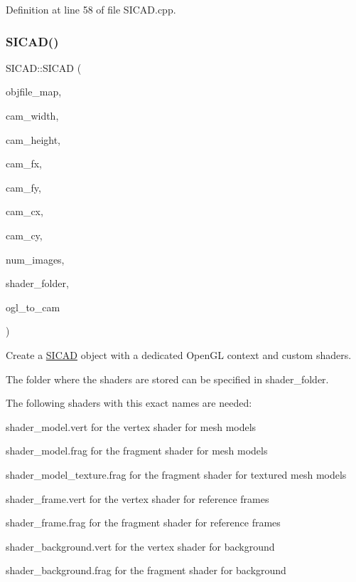 Definition at line 58 of file S\+I\+C\+A\+D.\+cpp.

\mbox{\label{classSICAD_a2d0feeca1d62a456f861046e377cd303}} 
\subsubsection{\texorpdfstring{S\+I\+C\+A\+D()}{SICAD()}\hspace{0.1cm}{\footnotesize\ttfamily [4/4]}}
{\footnotesize\ttfamily S\+I\+C\+A\+D\+::\+S\+I\+C\+AD (\begin{DoxyParamCaption}\item[{const \mbox{\hyperlink{classSICAD_a9e1e1460d4c0f331b4fd015aae4dd721}{Model\+Path\+Container}} \&}]{objfile\+\_\+map,  }\item[{const G\+Lsizei}]{cam\+\_\+width,  }\item[{const G\+Lsizei}]{cam\+\_\+height,  }\item[{const G\+Lfloat}]{cam\+\_\+fx,  }\item[{const G\+Lfloat}]{cam\+\_\+fy,  }\item[{const G\+Lfloat}]{cam\+\_\+cx,  }\item[{const G\+Lfloat}]{cam\+\_\+cy,  }\item[{const G\+Lint}]{num\+\_\+images,  }\item[{const std\+::string \&}]{shader\+\_\+folder,  }\item[{const std\+::vector$<$ float $>$ \&}]{ogl\+\_\+to\+\_\+cam }\end{DoxyParamCaption})}



Create a \mbox{\hyperlink{classSICAD}{S\+I\+C\+AD}} object with a dedicated Open\+GL context and custom shaders. 

The folder where the shaders are stored can be specified in {\ttfamily shader\+\_\+folder}.

The following shaders with this exact names are needed\+:


\begin{DoxyItemize}
\item {\ttfamily shader\+\_\+model.\+vert} for the vertex shader for mesh models
\item {\ttfamily shader\+\_\+model.\+frag} for the fragment shader for mesh models
\item {\ttfamily shader\+\_\+model\+\_\+texture.\+frag} for the fragment shader for textured mesh models
\item {\ttfamily shader\+\_\+frame.\+vert} for the vertex shader for reference frames
\item {\ttfamily shader\+\_\+frame.\+frag} for the fragment shader for reference frames
\item {\ttfamily shader\+\_\+background.\+vert} for the vertex shader for background
\item {\ttfamily shader\+\_\+background.\+frag} for the fragment shader for background
\end{DoxyItemize}

